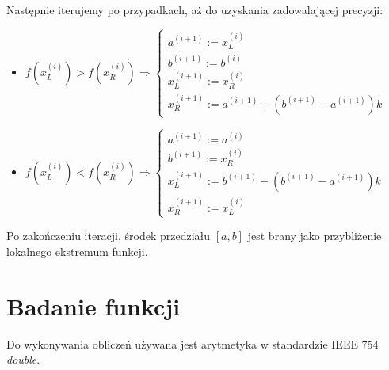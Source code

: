 \documentclass[a4paper,11pt]{article}
\begin{document}
    Następnie iterujemy po przypadkach, aż do uzyskania zadowalającej precyzji:
    \begin{itemize}
      \item \( f(x_L^{(i)}) > f(x_R^{(i)}) \Rightarrow \left\{\begin{array}{l}
        a^{(i+1)} := x_L^{(i)} \\
        b^{(i+1)} := b^{(i)} \\
        x_L^{(i+1)} := x_R^{(i)} \\
        x_R^{(i+1)} := a^{(i+1)} + (b^{(i+1)}-a^{(i+1)})k
        \end{array}\right. \)
      \item \( f(x_L^{(i)}) < f(x_R^{(i)}) \Rightarrow \left\{\begin{array}{l}
        a^{(i+1)} := a^{(i)} \\
        b^{(i+1)} := x_R^{(i)} \\
        x_L^{(i+1)} := b^{(i+1)} - (b^{(i+1)}-a^{(i+1)})k \\
        x_R^{(i+1)} := x_L^{(i)}
        \end{array}\right. \)
    \end{itemize}
    Po zakończeniu iteracji, środek przedziału $[a,b]$ jest brany jako przybliżenie lokalnego ekstremum funkcji.
  \section{Badanie funkcji}
    Do wykonywania obliczeń używana jest arytmetyka w standardzie IEEE 754 \emph{double}.
\end{document}
